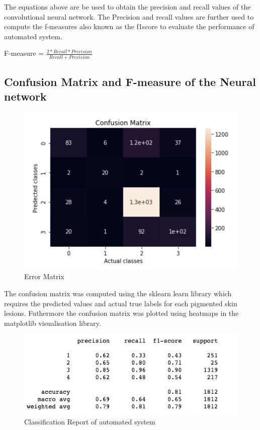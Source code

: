 The equations above are be used to obtain the precision and recall values of the 
convolutional neural network. The Precision and recall values are further used 
to compute the f-measures also known as the f1score to evaluate the performance of 
automated system. \\ 
\begin{center}
    F-measure = ${\frac{2 * Recall * Precision}{Recall + Precision}}$
\end{center}

\subsection*{Confusion Matrix and F-measure of the Neural network}
\begin{figure}[!htp]
    \includegraphics[width=\textwidth]{Images/cma.png}
    \caption{Error Matrix}
    \label{fig:ErrorMatrix}
\end{figure}

The confusion matrix was computed using the sklearn learn library which requires the predicted values and 
actual true labels for each pigmented skin lesions. Futhermore the confusion matrix  was plotted using heatmaps
in the matplotlib visualisation library.
\pagebreak

\begin{figure}[!htp]
    \includegraphics[width=\textwidth]{Images/f11.png}
    \caption{Classification Report of automated system}
    \label{fig:f11}
\end{figure}

